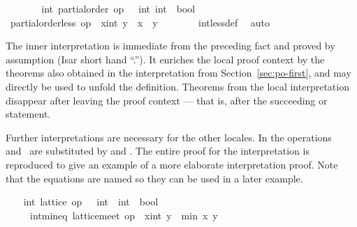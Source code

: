 \begin{isabellebody}
\ \ \ \ \isamarkupfalse%
\ \isamarkupfalse%
\ int{\isacharcolon}\ partial{\isacharunderscore}order\ {\isachardoublequoteopen}op\ {\isasymle}\ {\isacharcolon}{\isacharcolon}\ {\isacharbrackleft}int{\isacharcomma}\ int{\isacharbrackright}\ {\isasymRightarrow}\ bool{\isachardoublequoteclose}\ \isacommand{{\isachardot}}\isamarkupfalse%
\isanewline
\ \ \ \ \isamarkupfalse%
\ {\isachardoublequoteopen}partial{\isacharunderscore}order{\isachardot}less\ op\ {\isasymle}\ {\isacharparenleft}x{\isacharcolon}{\isacharcolon}int{\isacharparenright}\ y\ {\isacharequal}\ {\isacharparenleft}x\ {\isacharless}\ y{\isacharparenright}{\isachardoublequoteclose}\isanewline
\ \ \ \ \ \ \isamarkupfalse%
\ int{\isachardot}less{\isacharunderscore}def\ \isamarkupfalse%
\ auto\isanewline
\ \ \isamarkupfalse%
%
\endisatagvisible
{\isafoldvisible}%
%
\isadelimvisible
%
\endisadelimvisible
%
\begin{isamarkuptext}%
The inner interpretation is immediate from the preceding fact
  and proved by assumption (Isar short hand ``.'').  It enriches the
  local proof context by the theorems
  also obtained in the interpretation from Section~\ref{sec:po-first},
  and  may directly be used to unfold the
  definition.  Theorems from the local interpretation disappear after
  leaving the proof context --- that is, after the succeeding
   or  statement.%
\end{isamarkuptext}%
\isamarkuptrue%
%
\isamarkuptrue%
%
\begin{isamarkuptext}%
Further interpretations are necessary for
  the other locales.  In  the operations~\isa{{\isasymsqinter}}
  and~\isa{{\isasymsqunion}} are substituted by 
  and .  The entire proof for the
  interpretation is reproduced to give an example of a more
  elaborate interpretation proof.  Note that the equations are named
  so they can be used in a later example.%
\end{isamarkuptext}%
\isamarkuptrue%
%
\isadelimvisible
\ \ %
\endisadelimvisible
%
\isatagvisible
{}\isamarkupfalse%
\ int{\isacharcolon}\ lattice\ {\isachardoublequoteopen}op\ {\isasymle}\ {\isacharcolon}{\isacharcolon}\ int\ {\isasymRightarrow}\ int\ {\isasymRightarrow}\ bool{\isachardoublequoteclose}\isanewline
\ \ \ \ \ int{\isacharunderscore}min{\isacharunderscore}eq{\isacharcolon}\ {\isachardoublequoteopen}lattice{\isachardot}meet\ op\ {\isasymle}\ {\isacharparenleft}x{\isacharcolon}{\isacharcolon}int{\isacharparenright}\ y\ {\isacharequal}\ min\ x\ y{\isachardoublequoteclose}\isanewline

\end{isabellebody}
